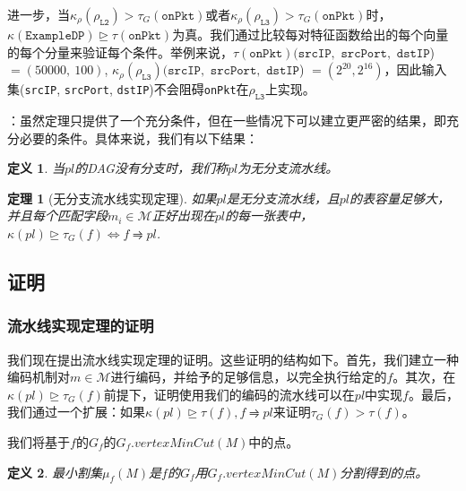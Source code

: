 \documentclass{ctexart}
\newcommand{\exampledp}{\texttt{ExampleDP}}
\newcommand{\para}[1]{\smallskip\noindent {\bf #1}}
\newtheorem{definition}{定义}
\newtheorem{theorem}{定理}
\begin{document}
进一步，当$\kappa_\rho(\rho_{\texttt{L2}}) > \tau_G(\texttt{onPkt})$或者$\kappa_\rho(\rho_{\texttt{L3}}) > \tau_G(\texttt{onPkt})$时，$\kappa(\exampledp) \trianglerighteq \tau(\texttt{onPkt})$为真。我们通过比较每对特征函数给出的每个向量的每个分量来验证每个条件。举例来说，$\tau(\texttt{onPkt})(\texttt{srcIP},$ $\texttt{srcPort},$ $\texttt{dstIP}$) $ = (50000,\ 100)$,  $\kappa_\rho(\rho_{\texttt{L3}})(\texttt{srcIP},$ $\texttt{srcPort},$ $\texttt{dstIP}$) $ = (2^{20}, 2^{16})$，因此输入集(\texttt{srcIP}, \texttt{srcPort}, \texttt{dstIP})不会阻碍\texttt{onPkt}在$\rho_{\texttt{L3}}$上实现。




\para{严密性}：虽然定理只提供了一个充分条件，但在一些情况下可以建立更严密的结果，即充分必要的条件。具体来说，我们有以下结果：

\begin{definition} 当$pl$的DAG没有分支时，我们称$pl$为无分支流水线。
\end{definition}

\begin{theorem}[无分支流水线实现定理] 如果$pl$是无分支流水线，且$pl$的表容量足够大，并且每个匹配字段$m_i \in \mathcal{M}$正好出现在$pl$的每一张表中，$\kappa(pl) \trianglerighteq \tau_G(f) \Leftrightarrow f \rightrightharpoons pl$.
\end{theorem}





\subsection{证明}

\subsubsection{流水线实现定理的证明}

我们现在提出流水线实现定理的证明。这些证明的结构如下。首先，我们建立一种编码机制对$m \in \mathcal{M}$进行编码，并给予的足够信息，以完全执行给定的$f$。其次，在$\kappa(pl) \trianglerighteq \tau_G(f)$前提下，证明使用我们的编码的流水线可以在$pl$中实现$f$。最后，我们通过一个扩展：如果$\kappa(pl) \trianglerighteq \tau(f), f \rightrightharpoons pl$来证明$\tau_G(f) > \tau(f)$。

我们将基于$f$的$G_f$的$G_f.vertexMinCut(M)$中的点。

\begin{definition}
最小割集$\mu_f(M)$是$f$的$G_f$用$G_f.vertexMinCut(M)$分割得到的点。
\end{definition}
\end{document}
